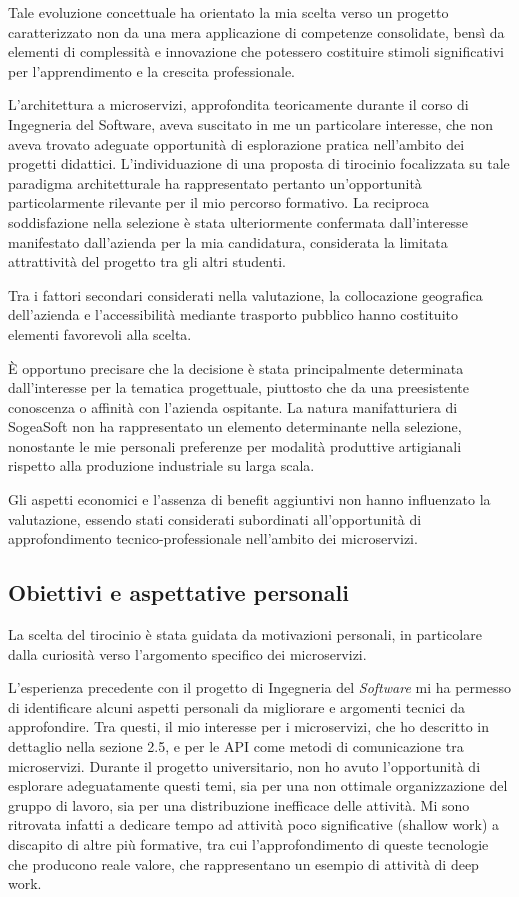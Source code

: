     Tale evoluzione concettuale ha orientato la mia scelta verso un progetto caratterizzato non da una mera applicazione di competenze consolidate, bensì da elementi di complessità e innovazione che potessero costituire stimoli significativi per l'apprendimento e la crescita professionale.

    L'architettura a microservizi, approfondita teoricamente durante il corso di Ingegneria del Software, aveva suscitato in me un particolare interesse, che non aveva trovato adeguate opportunità di esplorazione pratica nell'ambito dei progetti didattici. L'individuazione di una proposta di tirocinio focalizzata su tale paradigma architetturale ha rappresentato pertanto un'opportunità particolarmente rilevante per il mio percorso formativo. La reciproca soddisfazione nella selezione è stata ulteriormente confermata dall'interesse manifestato dall'azienda per la mia candidatura, considerata la limitata attrattività del progetto tra gli altri studenti.

    Tra i fattori secondari considerati nella valutazione, la collocazione geografica dell'azienda e l'accessibilità mediante trasporto pubblico hanno costituito elementi favorevoli alla scelta.

    È opportuno precisare che la decisione è stata principalmente determinata dall'interesse per la tematica progettuale, piuttosto che da una preesistente conoscenza o affinità con l'azienda ospitante. La natura manifatturiera di SogeaSoft non ha rappresentato un elemento determinante nella selezione, nonostante le mie personali preferenze per modalità produttive artigianali rispetto alla produzione industriale su larga scala.

    Gli aspetti economici e l'assenza di benefit aggiuntivi non hanno influenzato la valutazione, essendo stati considerati subordinati all'opportunità di approfondimento tecnico-professionale nell'ambito dei microservizi.
    
        \subsection{Obiettivi e aspettative personali}
        La scelta del tirocinio è stata guidata da motivazioni personali, in particolare dalla curiosità verso l'argomento specifico dei microservizi.

        L'esperienza precedente con il progetto di Ingegneria del \textit{Software} mi ha permesso di identificare alcuni aspetti personali da migliorare e argomenti tecnici da approfondire. Tra questi, il mio interesse per i microservizi, che ho descritto in dettaglio nella sezione 2.5, e per le API come metodi di comunicazione tra microservizi. Durante il progetto universitario, non ho avuto l'opportunità di esplorare adeguatamente questi temi, sia per una non ottimale organizzazione del gruppo di lavoro, sia per una distribuzione inefficace delle attività. Mi sono ritrovata infatti a dedicare tempo ad attività poco significative (shallow work) a discapito di altre più formative, tra cui l'approfondimento di queste tecnologie che producono reale valore, che rappresentano un esempio di attività di deep work.

